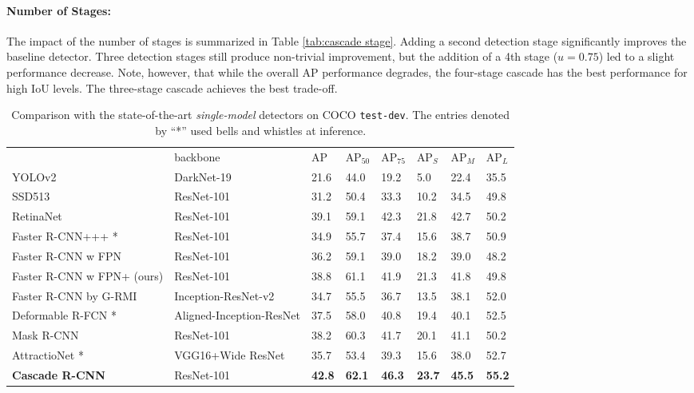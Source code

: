 \documentclass[10pt,twocolumn,letterpaper]{article}
\newcommand{\bd}[1]{\textbf{#1}}
\newcommand{\tablestyle}[2]{\setlength{\tabcolsep}{#1}\renewcommand{\arraystretch}{#2}\centering\footnotesize}
\begin{document}
\paragraph{Number of Stages:} The impact of the number of stages
is summarized in Table \ref{tab:cascade stage}. Adding a second
detection stage significantly improves the baseline detector.
Three detection stages still produce non-trivial improvement, but the
addition of a 4th stage ($u=0.75$) led to a slight performance
decrease. Note, however, that while the overall AP performance degrades,
the four-stage cascade has the best performance for high IoU levels. The three-stage cascade achieves the best trade-off.

\begin{table*}[t]
\tablestyle{3.5pt}{1.1}
\begin{tabular}{l|l|x{22}x{22}x{22}|x{22}x{22}x{22}}
&backbone &AP &AP$_{50}$ &AP$_{75}$  &AP$_{S}$ &AP$_{M}$ &AP$_{L}$\\\shline
YOLOv2 \cite{DBLP:conf/cvpr/RedmonDGF16}       &DarkNet-19 &21.6 &44.0 &19.2  &5.0 &22.4 &35.5\\
SSD513 \cite{DBLP:conf/eccv/LiuAESRFB16}    &ResNet-101 &31.2 &50.4 &33.3  &10.2 &34.5 &49.8\\
RetinaNet \cite{lin2017focal} &ResNet-101  &39.1 &59.1 &42.3  &21.8 &42.7 &50.2\\\hline
Faster R-CNN+++ \cite{DBLP:conf/cvpr/HeZRS16}*      &ResNet-101 &34.9 &55.7 &37.4  &15.6 &38.7 &50.9\\
Faster R-CNN w FPN \cite{lin2017feature}   &ResNet-101 &36.2 &59.1 &39.0  &18.2 &39.0 &48.2\\
Faster R-CNN w FPN+ (ours) &ResNet-101 &38.8 &61.1 &41.9  &21.3 &41.8 &49.8\\
Faster R-CNN by G-RMI \cite{DBLP:journals/corr/HuangRSZKFFWSG016} &Inception-ResNet-v2 &34.7 &55.5 &36.7  &13.5 &38.1 &52.0\\
Deformable R-FCN \cite{dai2017deformable}*   &Aligned-Inception-ResNet &37.5 &58.0 &40.8  &19.4 &40.1 &52.5\\
Mask R-CNN \cite{he2017mask}       &ResNet-101 &38.2 &60.3 &41.7  &20.1 &41.1 &50.2\\\hline
AttractioNet \cite{DBLP:conf/bmvc/GidarisK16}* &VGG16+Wide ResNet &35.7 &53.4 &39.3  &15.6 &38.0 &52.7\\
\bd{Cascade R-CNN} &ResNet-101 &\bd{42.8} &\bd{62.1} &\bd{46.3}  &\bd{23.7} &\bd{45.5} &\bd{55.2}\\\hline
\end{tabular}
\vspace{0.1cm}
\caption{Comparison with the state-of-the-art \emph{single-model} detectors on COCO \texttt{test-dev}. The entries denoted by ``*'' used bells and whistles at inference.}
\label{tab:state-of-the-art}
\end{table*}
\end{document}
